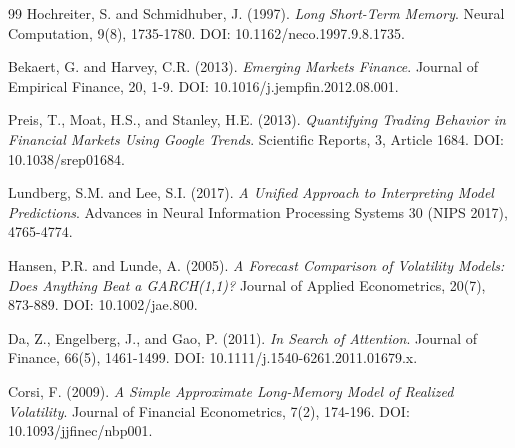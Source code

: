 \documentclass[12pt,a4paper]{article}
\begin{document}
\begin{thebibliography}{99}
Hochreiter, S. and Schmidhuber, J. (1997).
\textit{Long Short-Term Memory}.
Neural Computation, 9(8), 1735-1780.
DOI: 10.1162/neco.1997.9.8.1735.

Bekaert, G. and Harvey, C.R. (2013).
\textit{Emerging Markets Finance}.
Journal of Empirical Finance, 20, 1-9.
DOI: 10.1016/j.jempfin.2012.08.001.

Preis, T., Moat, H.S., and Stanley, H.E. (2013).
\textit{Quantifying Trading Behavior in Financial Markets Using Google Trends}.
Scientific Reports, 3, Article 1684.
DOI: 10.1038/srep01684.

Lundberg, S.M. and Lee, S.I. (2017).
\textit{A Unified Approach to Interpreting Model Predictions}.
Advances in Neural Information Processing Systems 30 (NIPS 2017), 4765-4774.

Hansen, P.R. and Lunde, A. (2005).
\textit{A Forecast Comparison of Volatility Models: Does Anything Beat a GARCH(1,1)?}
Journal of Applied Econometrics, 20(7), 873-889.
DOI: 10.1002/jae.800.

Da, Z., Engelberg, J., and Gao, P. (2011).
\textit{In Search of Attention}.
Journal of Finance, 66(5), 1461-1499.
DOI: 10.1111/j.1540-6261.2011.01679.x.

Corsi, F. (2009).
\textit{A Simple Approximate Long-Memory Model of Realized Volatility}.
Journal of Financial Econometrics, 7(2), 174-196.
DOI: 10.1093/jjfinec/nbp001.

\end{thebibliography}
\end{document}
